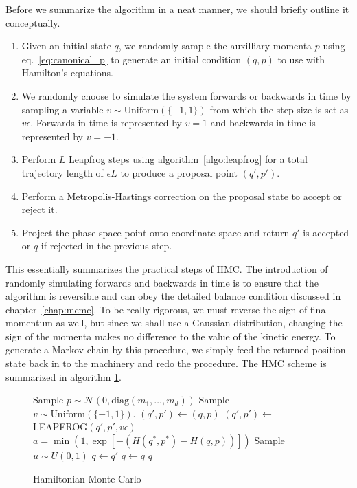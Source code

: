 Before we summarize the algorithm in a neat manner, we should briefly outline it conceptually. 
\begin{enumerate}
  \item Given an initial state $q$, we randomly sample the auxilliary momenta $p$ using eq.~\eqref{eq:canonical_p}
  to generate an initial condition $(q, p)$ to use with Hamilton's equations.
  \item We randomly choose to simulate the system forwards or backwards in time by sampling a variable $v \sim \text{Uniform}(\{-1, 1\})$
  from which the step size is set as $v\epsilon$. Forwards in time is represented by $v = 1$ and backwards in time is represented by $v = -1$.
  \item Perform $L$ Leapfrog steps using algorithm~\ref{algo:leapfrog} for a total trajectory length of $\epsilon L$ to produce
  a proposal point $(q', p')$.
  \item Perform a Metropolis-Hastings correction on the proposal state to accept or reject it.
  \item Project the phase-space point onto coordinate space and return $q'$ is accepted or $q$ if rejected in the previous step.
\end{enumerate}
This essentially summarizes the practical steps of HMC. The introduction of randomly simulating
forwards and backwards in time is to ensure that the algorithm is reversible and can obey the detailed balance condition discussed in chapter~\ref{chap:mcmc}.
To be really rigorous, we must reverse the sign of final momentum as well, but since we shall use a Gaussian distribution, changing the sign
of the momenta makes no difference to the value of the kinetic energy. 
To generate a Markov chain by this procedure, we simply feed the returned position state back in to the machinery 
and redo the procedure.
The HMC scheme is summarized in algorithm \ref{algo:hmc}.
\begin{figure}[H]
	\begin{algorithm}[H]
		\caption{Hamiltonian Monte Carlo}\label{algo:hmc}
		\begin{algorithmic}
      \State Sample $p \sim \mathcal{N}(0, \text{diag}(m_1, \ldots, m_d))$ 
      \State Sample $v \sim \text{Uniform}(\{-1, 1\})$. 
      \State $(q', p') \leftarrow (q, p)$    
       
        \State $(q', p') \leftarrow$ LEAPFROG$(q', p', v\epsilon)$ 
      \EndFor
      \State $a = \min \left(1, \exp\left[-\left(H(q^*,p^*) - H(q, p)\right)\right]\right)$ 
      \State Sample $u \sim U(0,1)$ 
       
        \State $q \gets q'$ 
      \Else
        \State $q \gets q$ 
      \EndIf
      \State \Return $q$
      \EndFunction
		\end{algorithmic}
	\end{algorithm}
\end{figure}

